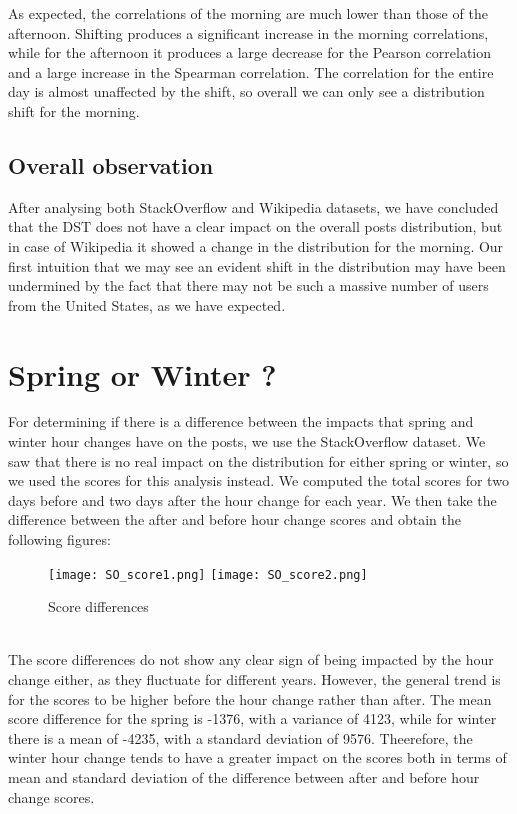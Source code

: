\documentclass[11pt]{article}
\begin{document}
As expected, the correlations of the morning are much lower than those of the afternoon. Shifting produces a significant increase in the morning correlations, while for the afternoon it produces a large decrease for the Pearson correlation and a large increase in the Spearman correlation. The correlation for the entire day is almost unaffected by the shift, so overall we can only see a distribution shift for the morning.

\subsection{Overall observation}
After analysing both StackOverflow and Wikipedia datasets, we have concluded that the DST does not have a clear impact on the overall posts distribution, but in case of Wikipedia it showed a change in the distribution for the morning. Our first intuition that we may see an evident shift in the distribution may have been undermined by the fact that there may not be such a massive number of users from the United States, as we have expected.

\section{Spring or Winter ?}
\label{sec:spring_winter}
For determining if there is a difference between the impacts that spring and winter hour changes have on the posts, we use the StackOverflow dataset. We saw that there is no real impact on the distribution for either spring or winter, so we used the scores for this analysis instead. We computed the total scores for two days before and two days after the hour change for each year. We then take the difference between the after and before hour change scores and obtain the following figures:
\begin{figure}[h!]
\centering
\texttt{[image: SO\_score1.png]}
\centering
\texttt{[image: SO\_score2.png]}
\caption{Score differences}
\end{figure}\\
The score differences do not show any clear sign of being impacted by the hour change either, as they fluctuate for different years. However, the general trend is for the scores to be higher before the hour change rather than after. The mean score difference for the spring is -1376, with a variance of 4123, while for winter there is a mean of -4235, with a standard deviation of 9576. Theerefore, the winter hour change tends to have a greater impact on the scores both in terms of mean and standard deviation of the difference between after and before hour change scores.
\end{document}

